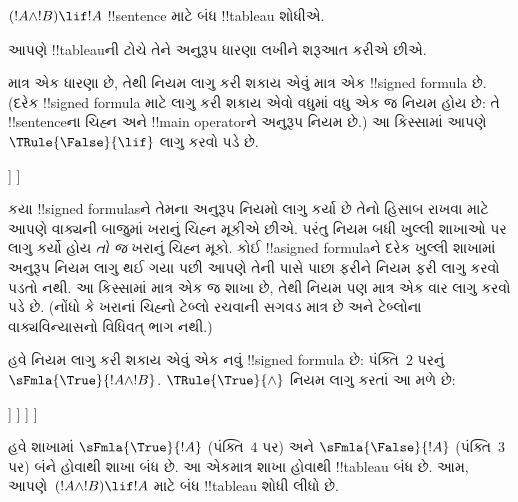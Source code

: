 \documentclass[../../../include/open-logic-section]{subfiles}
\begin{document}
      {}
      {}


\begin{ex}
$(!A \land !B) \lif !A$ !!{sentence} માટે બંધ !!{tableau} શોધીએ.

આપણે !!{tableau}ની ટોચે તેને અનુરૂપ ધારણા લખીને શરૂઆત કરીએ છીએ.
\begin{oltableau}
  [\sFmla{\False}{(\formula{A} \land \formula{B}) \lif \formula{A}},
    just = \TAss]
\end{oltableau}

માત્ર એક ધારણા છે, તેથી નિયમ લાગુ કરી શકાય એવું માત્ર એક
!!{signed formula} છે. (દરેક !!{signed formula} માટે લાગુ કરી શકાય એવો
વધુમાં વધુ એક જ નિયમ હોય છે: તે !!{sentence}ના ચિહ્ન અને
!!{main operator}ને અનુરૂપ નિયમ છે.) આ કિસ્સામાં આપણે
$\TRule{\False}{\lif}$ લાગુ કરવો પડે છે.
\begin{oltableau}
  [\sFmla{\False}{(\formula{A} \land \formula{B}) \lif \formula{A}},
    checked, just = \TAss
    [\sFmla{\True}{\formula{A} \land \formula{B}},
      just={\TRule{\False}{\lif}[1]}
      [\sFmla{\False}{\formula{A}}, just={\TRule{\False}{\lif}[1]}]
    ]
  ]
\end{oltableau}
કયા !!{signed formula}sને તેમના અનુરૂપ નિયમો લાગુ કર્યા છે તેનો હિસાબ
રાખવા માટે આપણે વાક્યની બાજુમાં ખરાનું ચિહ્ન મૂકીએ છીએ. પરંતુ નિયમ
બધી ખુલ્લી શાખાઓ પર લાગુ કર્યો હોય \emph{તો જ} ખરાનું ચિહ્ન મૂકો. કોઈ
!!a{signed formula}ને દરેક ખુલ્લી શાખામાં અનુરૂપ નિયમ લાગુ થઈ ગયા પછી
આપણે તેની પાસે પાછા ફરીને નિયમ ફરી લાગુ કરવો પડતો નથી. આ કિસ્સામાં
માત્ર એક જ શાખા છે, તેથી નિયમ પણ માત્ર એક વાર લાગુ કરવો પડે છે. (નોંધો
કે ખરાનાં ચિહ્નો ટેબ્લો રચવાની સગવડ માત્ર છે અને ટેબ્લોના વાક્યવિન્યાસનો
વિધિવત્ ભાગ નથી.)

હવે નિયમ લાગુ કરી શકાય એવું એક નવું !!{signed formula} છે: પંક્તિ~$2$
પરનું $\sFmla{\True}{!A \land !B}$. $\TRule{\True}{\land}$ નિયમ લાગુ
કરતાં આ મળે છે:
\begin{oltableau}
  [\sFmla{\False}{(\formula{A} \land \formula{B}) \lif \formula{A}},
    checked, just = \TAss
    [\sFmla{\True}{\formula{A} \land \formula{B}},
      just={\TRule{\False}{\lif}[1]}, checked
      [\sFmla{\False}{\formula{A}}, just={\TRule{\False}{\lif}[1]}
        [\sFmla{\True}{\formula{A}}, just={\TRule{\True}{\land}[2]}
          [\sFmla{\True}{\formula{B}}, just={\TRule{\True}{\land}[2]}, close
          ]
        ]
      ]
    ]
  ]
\end{oltableau}
હવે શાખામાં $\sFmla{\True}{!A}$ (પંક્તિ~$4$ પર) અને
$\sFmla{\False}{!A}$ (પંક્તિ~$3$ પર) બંને હોવાથી શાખા બંધ છે. આ એકમાત્ર
શાખા હોવાથી !!{tableau} બંધ છે. આમ, આપણે~$(!A \land !B) \lif !A$ માટે
બંધ !!{tableau} શોધી લીધો છે.
\end{ex}
\end{document}
